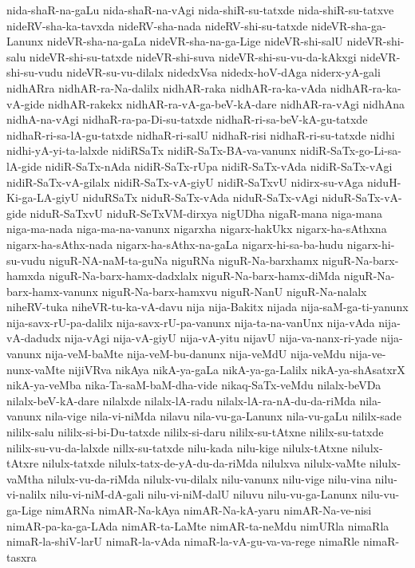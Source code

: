 {nida-shaR-na-gaLu
nida-shaR-na-vAgi
nida-shiR-su-tatxde
nida-shiR-su-tatxve
nideRV-sha-ka-tavxda
nideRV-sha-nada
nideRV-shi-su-tatxde
nideVR-sha-ga-Lanunx
nideVR-sha-na-gaLa
nideVR-sha-na-ga-Lige
nideVR-shi-salU
nideVR-shi-salu
nideVR-shi-su-tatxde
nideVR-shi-suva
nideVR-shi-su-vu-da-kAkxgi
nideVR-shi-su-vudu
nideVR-su-vu-dilalx
nidedxVsa
nidedx-hoV-dAga
niderx-yA-gali
nidhARra
nidhAR-ra-Na-dalilx
nidhAR-raka
nidhAR-ra-ka-vAda
nidhAR-ra-ka-vA-gide
nidhAR-rakekx
nidhAR-ra-vA-ga-beV-kA-dare
nidhAR-ra-vAgi
nidhAna
nidhA-na-vAgi
nidhaR-ra-pa-Di-su-tatxde
nidhaR-ri-sa-beV-kA-gu-tatxde
nidhaR-ri-sa-lA-gu-tatxde
nidhaR-ri-salU
nidhaR-risi
nidhaR-ri-su-tatxde
nidhi
nidhi-yA-yi-ta-lalxde
nidiRSaTx
nidiR-SaTx-BA-va-vanunx
nidiR-SaTx-go-Li-sa-lA-gide
nidiR-SaTx-nAda
nidiR-SaTx-rUpa
nidiR-SaTx-vAda
nidiR-SaTx-vAgi
nidiR-SaTx-vA-gilalx
nidiR-SaTx-vA-giyU
nidiR-SaTxvU
nidirx-su-vAga
niduH-Ki-ga-LA-giyU
niduRSaTx
niduR-SaTx-vAda
niduR-SaTx-vAgi
niduR-SaTx-vA-gide
niduR-SaTxvU
niduR-SeTxVM-dirxya
nigUDha
nigaR-mana
niga-mana
niga-ma-nada
niga-ma-na-vanunx
nigarxha
nigarx-hakUkx
nigarx-ha-sAthxna
nigarx-ha-sAthx-nada
nigarx-ha-sAthx-na-gaLa
nigarx-hi-sa-ba-hudu
nigarx-hi-su-vudu
niguR-NA-naM-ta-guNa
niguRNa
niguR-Na-barxhamx
niguR-Na-barx-hamxda
niguR-Na-barx-hamx-dadxlalx
niguR-Na-barx-hamx-diMda
niguR-Na-barx-hamx-vanunx
niguR-Na-barx-hamxvu
niguR-NanU
niguR-Na-nalalx
niheRV-tuka
niheVR-tu-ka-vA-davu
nija
nija-Bakitx
nijada
nija-saM-ga-ti-yanunx
nija-savx-rU-pa-dalilx
nija-savx-rU-pa-vanunx
nija-ta-na-vanUnx
nija-vAda
nija-vA-dadudx
nija-vAgi
nija-vA-giyU
nija-vA-yitu
nijavU
nija-va-nanx-ri-yade
nija-vanunx
nija-veM-baMte
nija-veM-bu-danunx
nija-veMdU
nija-veMdu
nija-ve-nunx-vaMte
nijiVRva
nikAya
nikA-ya-gaLa
nikA-ya-ga-Lalilx
nikA-ya-shAsatxrX
nikA-ya-veMba
nika-Ta-saM-baM-dha-vide
nikaq-SaTx-veMdu
nilalx-beVDa
nilalx-beV-kA-dare
nilalxde
nilalx-lA-radu
nilalx-lA-ra-nA-du-da-riMda
nila-vanunx
nila-vige
nila-vi-niMda
nilavu
nila-vu-ga-Lanunx
nila-vu-gaLu
nililx-sade
nililx-salu
nililx-si-bi-Du-tatxde
nililx-si-daru
nililx-su-tAtxne
nililx-su-tatxde
nililx-su-vu-da-lalxde
nillx-su-tatxde
nilu-kada
nilu-kige
nilulx-tAtxne
nilulx-tAtxre
nilulx-tatxde
nilulx-tatx-de-yA-du-da-riMda
nilulxva
nilulx-vaMte
nilulx-vaMtha
nilulx-vu-da-riMda
nilulx-vu-dilalx
nilu-vanunx
nilu-vige
nilu-vina
nilu-vi-nalilx
nilu-vi-niM-dA-gali
nilu-vi-niM-dalU
niluvu
nilu-vu-ga-Lanunx
nilu-vu-ga-Lige
nimARNa
nimAR-Na-kAya
nimAR-Na-kA-yaru
nimAR-Na-ve-nisi
nimAR-pa-ka-ga-LAda
nimAR-ta-LaMte
nimAR-ta-neMdu
nimURla
nimaRla
nimaR-la-shiV-larU
nimaR-la-vAda
nimaR-la-vA-gu-va-va-rege
nimaRle
nimaR-tasxra
}
